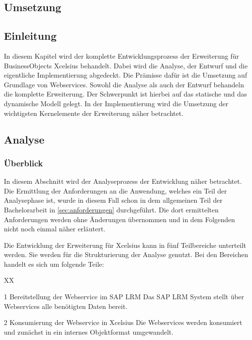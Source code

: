 \begin{onehalfspacing}
\chapter{Umsetzung}

\section{Einleitung}
In diesem Kapitel wird der komplette Entwicklungsprozess der Erweiterung für BusinessObjects Xcelsius behandelt. Dabei wird die Analyse, der Entwurf und die eigentliche Implementierung abgedeckt. Die Prämisse dafür ist die Umsetzung auf Grundlage von Webservices. Sowohl die Analyse als auch der Entwurf behandeln die komplette Erweiterung. Der Schwerpunkt ist hierbei auf das statische und das dynamische Modell gelegt. In der Implementierung wird die Umsetzung der wichtigsten Kernelemente der Erweiterung näher betrachtet.

\section{Analyse}

\subsection{Überblick}
In diesem Abschnitt wird der Analyseprozess der Entwicklung näher betrachtet. Die Ermittlung der Anforderungen an die Anwendung, welches ein Teil der Analysephase ist, wurde in diesem Fall schon in dem allgemeinen Teil der Bachelorarbeit in \vref{sec:anforderungen} durchgeführt. Die dort ermittelten Anforderungen werden ohne Änderungen übernommen und in dem Folgenden nicht noch einmal näher erläutert.

Die Entwicklung der Erweiterung für \gls{Xcelsius} kann in fünf Teilbereiche unterteilt werden. Sie werden für die Strukturierung der Analyse genutzt. Bei den Bereichen handelt es sich um folgende Teile:


\begin{seToplist} { XX }
\item[1] Bereitstellung der Webservice im SAP LRM \newline
Das SAP LRM System stellt über Webservices alle benötigten Daten bereit.

\item[2] Konsumierung der Webservice in \gls{Xcelsius} \newline
Die Webservices werden konsumiert und zunächst in ein internes Objektformat umgewandelt.


\end{seToplist}
\end{onehalfspacing}
